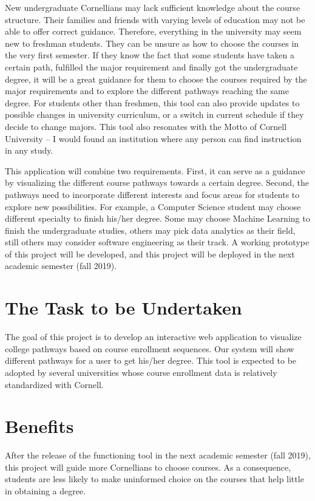 \documentclass{article}
\begin{document}
\vspace{0.4cm}New undergraduate Cornellians may lack sufficient knowledge about the course structure. Their families and friends with varying levels of education may not be able to offer correct guidance. Therefore, everything in the university may seem new to freshman students. They can be unsure as how to choose the courses in the very first semester. If they know the fact that some students have taken a certain path,  fulfilled the major requirement and finally got the undergraduate degree, it will be a great guidance for them to choose the courses required by the major requirements and to explore the different pathways reaching the same degree. For students other than freshmen, this tool can also provide updates to possible changes in university curriculum, or a switch in current schedule if they decide to change majors. This tool also resonates with the Motto of Cornell University -- I would found an institution where any person can find instruction in any study.

\vspace{0.4cm}This application will combine two requirements. First, it can serve as a guidance by visualizing the different course pathways towards a certain degree. Second, the pathways need to incorporate different interests and focus areas for students to explore new possibilities. For example, a Computer Science student may choose different specialty to finish his/her degree. Some may choose Machine Learning to finish the undergraduate studies, others may pick data analytics as their field, still others may consider software engineering as their track. A working prototype of this project will be developed, and this project will be deployed in the next academic semester (fall 2019).

\section{The Task to be Undertaken}
The goal of this project is to develop an interactive web application to visualize college pathways based on course enrollment sequences. Our system will show different pathways for a user to get his/her degree. This tool is expected to be adopted by several universities whose course enrollment data is relatively standardized with Cornell.

\section{Benefits}
After the release of the functioning tool in the next academic semester (fall 2019), this project will guide more Cornellians to choose courses. As a consequence, students are less likely to make uninformed choice on the courses that help little in obtaining a degree.
\end{document}
